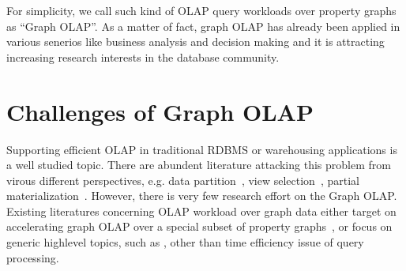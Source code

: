 For simplicity, we call such kind of OLAP query workloads over property graphs as ``Graph OLAP''. As a matter of fact, graph OLAP has already been applied in various senerios like business analysis and decision making and it is attracting increasing research interests in the database community.



\section{Challenges of Graph OLAP}


Supporting efficient OLAP in traditional RDBMS or warehousing applications is a well studied topic. There are abundent literature attacking this problem from virous different perspectives, e.g. data partition~\cite{DBLP:conf/ismis/CuzzocreaL12}, view selection~\cite{DBLP:books/igi/Taniar10/LawrenceR10}, partial materialization~\cite{DBLP:journals/kais/DrzadzewskiT16}. However, there is very few research effort on the Graph OLAP. Existing literatures concerning OLAP workload over graph data either target on accelerating graph OLAP over a special subset of property graphs~\cite{DBLP:conf/sigmod/ZhaoLXH11}, or focus on generic highlevel topics, such as \cite{DBLP:conf/esws/MaaliCD15} \cite{DBLP:conf/icdm/ChenYZHY08},  other than time efficiency issue of query processing.


